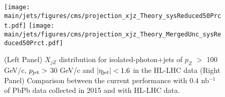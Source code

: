 \begin{figure}[!ht]
\begin{center}
\texttt{[image: \\main/jets/figures/cms/projection\_xjz\_Theory\_sysReduced50Prct.pdf]}
\texttt{[image: \\main/jets/figures/cms/projection\_xjz\_Theory\_MergedUnc\_sysReduced50Prct.pdf]}
\caption{(Left Panel) $X_{jZ}$ distribution for isolated-photon+jets of $p_{Z}$ $> $ 100 GeV/c, $p_{\rm jet} > $ 30 GeV/c and $|\eta_{\rm jet}| < 1.6$ in the HL-LHC data (Right Panel) Comparison between the current performance with 0.4 nb$^{-1}$ of PbPb data collected in 2015 and with HL-LHC data. \cite{CMS-FTR-17-002:2017dec}}
\label{fig:Zjet}
\end{center}
\end{figure}